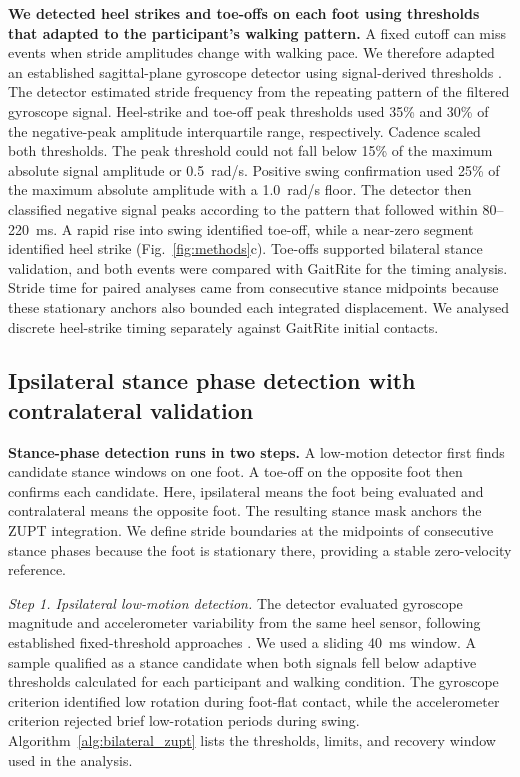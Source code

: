 \documentclass[11pt]{article}
\begin{document}
\textbf{We detected heel strikes and toe-offs on each foot using thresholds that adapted to the participant's walking pattern.} A fixed cutoff can miss events when stride amplitudes change with walking pace. We therefore adapted an established sagittal-plane gyroscope detector \citep{Salarian2004} using signal-derived thresholds \citep{Greene2010}. The detector estimated stride frequency from the repeating pattern of the filtered gyroscope signal. Heel-strike and toe-off peak thresholds used 35\% and 30\% of the negative-peak amplitude interquartile range, respectively. Cadence scaled both thresholds. The peak threshold could not fall below 15\% of the maximum absolute signal amplitude or 0.5~rad/s. Positive swing confirmation used 25\% of the maximum absolute amplitude with a 1.0~rad/s floor. The detector then classified negative signal peaks according to the pattern that followed within 80--220~ms. A rapid rise into swing identified toe-off, while a near-zero segment identified heel strike (Fig.~\ref{fig:methods}c). Toe-offs supported bilateral stance validation, and both events were compared with GaitRite for the timing analysis. Stride time for paired analyses came from consecutive stance midpoints because these stationary anchors also bounded each integrated displacement. We analysed discrete heel-strike timing separately against GaitRite initial contacts.

\subsection{Ipsilateral stance phase detection with contralateral validation}\label{sec:stance}

\textbf{Stance-phase detection runs in two steps.} A low-motion detector first finds candidate stance windows on one foot. A toe-off on the opposite foot then confirms each candidate. Here, ipsilateral means the foot being evaluated and contralateral means the opposite foot. The resulting stance mask anchors the ZUPT integration. We define stride boundaries at the midpoints of consecutive stance phases because the foot is stationary there, providing a stable zero-velocity reference.

\textit{Step 1. Ipsilateral low-motion detection.} The detector evaluated gyroscope magnitude and accelerometer variability from the same heel sensor, following established fixed-threshold approaches \citep{Skog2010, Foxlin2005}. We used a sliding 40~ms window. A sample qualified as a stance candidate when both signals fell below adaptive thresholds calculated for each participant and walking condition. The gyroscope criterion identified low rotation during foot-flat contact, while the accelerometer criterion rejected brief low-rotation periods during swing. Algorithm~\ref{alg:bilateral_zupt} lists the thresholds, limits, and recovery window used in the analysis.
\end{document}
